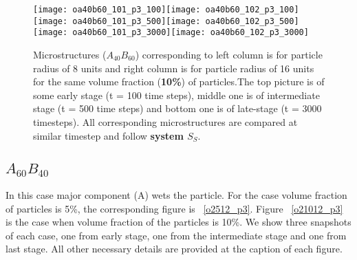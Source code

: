 \documentclass[12pt]{iiscthes}
\theoremstyle{definition}
\theoremstyle{definition}
\theoremstyle{remark}
\begin{document}
 \begin{figure}[H]
\begin{center}
\texttt{[image: oa40b60\_101\_p3\_100]}\texttt{[image: oa40b60\_102\_p3\_100]}\\
\texttt{[image: oa40b60\_101\_p3\_500]}\texttt{[image: oa40b60\_102\_p3\_500]}\\
\texttt{[image: oa40b60\_101\_p3\_3000]}\texttt{[image: oa40b60\_102\_p3\_3000]}\\
\caption{Microstructures ($A_{40}B_{60}$) corresponding to left column is for particle radius of 8 units and right column is for particle radius of 16 units for the same volume fraction (\textbf{10\%}) of particles.The top picture is of some early stage (t = 100 time steps), middle one is of intermediate stage (t = 500 time steps) and bottom one is of late-stage (t = 3000 timesteps). All corresponding microstructures are compared at similar timestep and follow \textbf{system $S_S$}.}\label{o11012_p3}
\end{center}
\end{figure}
\subsection{$A_{60}B_{40}$} In this case major component (A) wets the particle. For the case volume fraction of particles is 5\%, the corresponding figure is ~\ref{o2512_p3}. Figure ~\ref{o21012_p3} is the case when volume fraction of the particles is 10\%.  We show three snapshots of each case, one from early stage, one from the intermediate stage and one from last stage. All other necessary details are provided at the caption of each figure.
\end{document}
